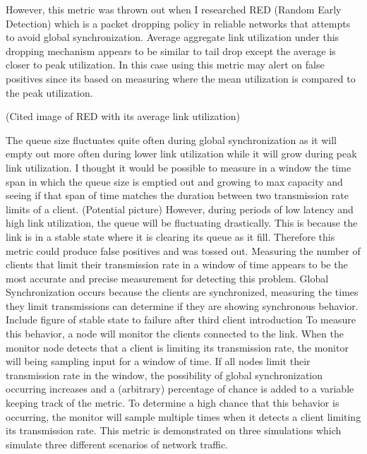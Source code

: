 \documentclass{article}
\begin{document}
	However, this metric was thrown out when I researched RED (Random Early Detection) which is a packet dropping policy in reliable networks that attempts to avoid global synchronization. Average aggregate link utilization under this dropping mechanism appears to be similar to tail drop except the average is closer to peak utilization. In this case using this metric may alert on false positives since its based on measuring where the mean utilization is compared to the peak utilization. \newline
	
																			(Cited image of RED with its average link utilization)
	
	The queue size fluctuates quite often during global synchronization as it will empty out more often during lower link utilization while it will grow during peak link utilization. I thought it would be possible to measure in a window the time span in which the queue size is emptied out and growing to max capacity and seeing if that span of time matches the duration between two transmission rate limits of a client.\newline
	(Potential picture)\newline
	However, during periods of low latency and high link utilization, the queue will be fluctuating drastically. This is because the link is in a stable state where it is clearing its queue as it fill. Therefore this metric could produce false positives and was tossed out.\newline
	Measuring the number of clients that limit their transmission rate in a window of time appears to be the most accurate and precise measurement for detecting this problem. Global Synchronization occurs because the clients are synchronized, measuring the times they limit transmissions can determine if they are showing synchronous behavior.\newline
																{Include figure of stable state to failure after third client introduction}
	To measure this behavior, a node will monitor the clients connected to the link. When the monitor node detects that a client is limiting its transmission rate, the monitor will being sampling input for a window of time. If all nodes limit their transmission rate in the window, the possibility of global synchronization occurring increases and a (arbitrary) percentage of chance is added to a variable keeping track of the metric. To determine a high chance that this behavior is occurring, the monitor will sample multiple times when it detects a client limiting its transmission rate.\newline
	This metric is demonstrated on three simulations which simulate three different scenarios of network traffic.\newline
	
\end{document}
